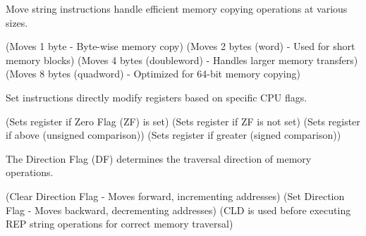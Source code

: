 \begin{NxSSSSBox}
	\begin{NxIDBox}
		Move string instructions handle efficient memory copying operations at various sizes.
		\begin{NxListDark}
			 (Moves 1 byte - Byte-wise memory copy)
			 (Moves 2 bytes (word) - Used for short memory blocks)
			 (Moves 4 bytes (doubleword) - Handles larger memory transfers)
			 (Moves 8 bytes (quadword) - Optimized for 64-bit memory copying)
		\end{NxListDark}
	\end{NxIDBox}
\end{NxSSSSBox}

\begin{NxSSSSBox}
	\begin{NxIDBox}
		Set instructions directly modify registers based on specific CPU flags.
		\begin{NxListDark}
			 (Sets register if Zero Flag (ZF) is set)
			 (Sets register if ZF is not set)
			 (Sets register if above (unsigned comparison))
			 (Sets register if greater (signed comparison))
		\end{NxListDark}
	\end{NxIDBox}
\end{NxSSSSBox}

\begin{NxSSSSBox}
	\begin{NxIDBox}
		The Direction Flag (DF) determines the traversal direction of memory operations.
		\begin{NxListDark}
			 (Clear Direction Flag - Moves forward, incrementing addresses)
			 (Set Direction Flag - Moves backward, decrementing addresses)
			 (CLD is used before executing REP string operations for correct memory traversal)
		\end{NxListDark}
	\end{NxIDBox}
\end{NxSSSSBox}

\begin{comment}
Memory Unit Example Size Typical Speed
Registers 16, 64-bit registers ~1 nanoseconds13
Cache Memory 4 - 8+ Megabytes14
(L1 and L2)
~5-60 nanoseconds
Primary Storage
 (i.e., main memory)
2 – 32+ Gigabytes15 ~100-150 nanoseconds
Secondary Storage
 (i.e., disk, SSD's, etc.)
500 Gigabytes –
 4+ Terabytes16
~3-15 milliseconds
\end{comment}

